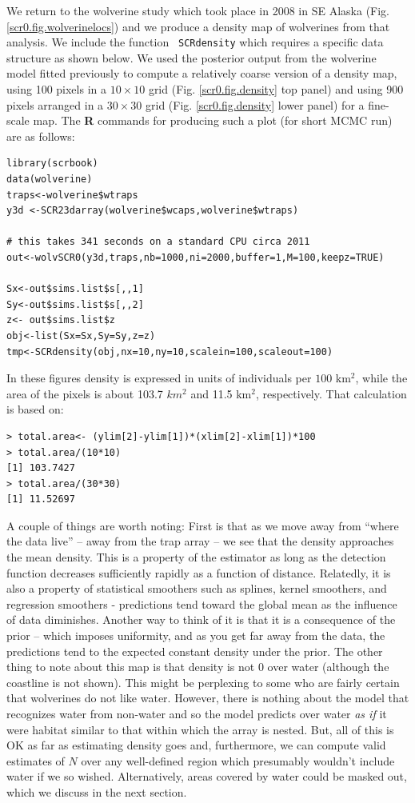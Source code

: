 We return to the wolverine study which took place in 2008 in SE Alaska
(Fig. \ref{scr0.fig.wolverinelocs}) and we produce a density map of
wolverines from that analysis. We include the function \mbox{\tt
  SCRdensity} which requires a specific data structure as shown below.
We used the posterior output from the wolverine model fitted
previously to compute a relatively coarse version of a density map,
using 100 pixels in a $10 \times 10$ grid (Fig. \ref{scr0.fig.density}
top panel) and using 900 pixels arranged in a $30 \times 30$ grid
(Fig. \ref{scr0.fig.density} lower panel) for a fine-scale map. The
{\bf R} commands for producing such a plot (for short MCMC run) are as
follows: 
{\small
\begin{verbatim}
library(scrbook)
data(wolverine)
traps<-wolverine$wtraps
y3d <-SCR23darray(wolverine$wcaps,wolverine$wtraps)

# this takes 341 seconds on a standard CPU circa 2011
out<-wolvSCR0(y3d,traps,nb=1000,ni=2000,buffer=1,M=100,keepz=TRUE)

Sx<-out$sims.list$s[,,1]
Sy<-out$sims.list$s[,,2]
z<- out$sims.list$z
obj<-list(Sx=Sx,Sy=Sy,z=z)
tmp<-SCRdensity(obj,nx=10,ny=10,scalein=100,scaleout=100)
\end{verbatim}
In these figures density is
expressed in units of individuals per $100$ km$^2$, while the area of
the pixels is about 103.7 $km^2$ and 11.5 km$^2$, respectively. That
calculation is based on:
\begin{verbatim}
> total.area<- (ylim[2]-ylim[1])*(xlim[2]-xlim[1])*100
> total.area/(10*10)
[1] 103.7427
> total.area/(30*30)
[1] 11.52697
\end{verbatim}

A couple of things are worth noting: First is that as we move away
from ``where the data live'' -- away from the trap array -- we see that
the density approaches the mean density. This is a property of the
estimator as long as the detection function decreases sufficiently
rapidly as a function of distance.  Relatedly, it is also a property
of statistical smoothers such as splines, kernel smoothers, and
regression smoothers - predictions tend toward the global mean as the
influence of data diminishes.
 Another way to think of it is that it is
a consequence of the prior -- which imposes uniformity, and as you get
far away from the data, the predictions tend to the expected constant
density under the prior.  The other thing to note about this map is
that density is not $0$ over water (although the coastline is not
shown). This might be perplexing to some who are fairly certain that
wolverines do not like water. However, there is nothing about the
model that recognizes water from non-water and so the model predicts
over water {\it as if} it were habitat similar to that within which
the array is nested. But, all of this is OK as far as estimating
density goes and, furthermore, we can compute valid estimates of $N$
over any well-defined region which presumably wouldn't include water
if we so wished. Alternatively, areas covered by water could be masked
out, which we discuss in the next section.

}
